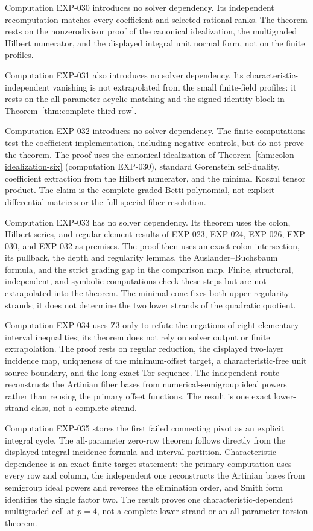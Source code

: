 \documentclass[11pt]{article}
\theoremstyle{definition}
\theoremstyle{remark}
\begin{document}
Computation EXP-030 introduces no solver dependency. Its independent recomputation matches every
coefficient and selected rational ranks. The theorem rests on the nonzerodivisor proof of the
canonical idealization, the multigraded Hilbert numerator, and the displayed integral unit normal
form, not on the finite profiles.

Computation EXP-031 also introduces no solver dependency. Its characteristic-independent vanishing
is not extrapolated from the small finite-field profiles: it rests on the all-parameter acyclic
matching and the signed identity block in Theorem~\ref{thm:complete-third-row}.

Computation EXP-032 introduces no solver dependency. The finite computations test the coefficient
implementation, including negative controls, but do not prove the theorem. The proof uses the
canonical idealization of Theorem~\ref{thm:colon-idealization-six} (computation EXP-030),
standard Gorenstein self-duality, coefficient extraction from the Hilbert numerator, and the
minimal Koszul tensor product. The claim is the complete graded Betti polynomial, not explicit
differential matrices or the full special-fiber resolution.

Computation EXP-033 has no solver dependency. Its theorem uses the colon, Hilbert-series, and
regular-element results of EXP-023, EXP-024, EXP-026, EXP-030, and EXP-032 as premises. The proof
then uses an exact colon intersection, its pullback, the depth and regularity lemmas, the
Auslander--Buchsbaum formula, and the strict grading gap in the comparison map. Finite,
structural, independent, and symbolic computations check these steps but are not extrapolated
into the theorem. The minimal cone fixes both upper regularity strands; it does not determine the
two lower strands of the quadratic quotient.

Computation EXP-034 uses Z3 only to refute the negations of eight elementary interval
inequalities; its theorem does not rely on solver output or finite extrapolation. The proof rests
on regular reduction, the displayed two-layer incidence map, uniqueness of the minimum-offset
target, a characteristic-free unit source boundary, and the long exact Tor sequence. The
independent route reconstructs the Artinian fiber bases from numerical-semigroup ideal powers
rather than reusing the primary offset functions. The result is one exact lower-strand class, not
a complete strand.

Computation EXP-035 stores the first failed connecting pivot as an explicit integral cycle. The
all-parameter zero-row theorem follows directly from the displayed integral incidence formula and
interval partition. Characteristic dependence is an exact finite-target statement: the primary
computation uses every row and column, the independent one reconstructs the Artinian bases from
semigroup ideal powers and reverses the elimination order, and Smith form identifies the single
factor two. The result proves one characteristic-dependent multigraded cell at $p=4$, not a
complete lower strand or an all-parameter torsion theorem.
\end{document}
